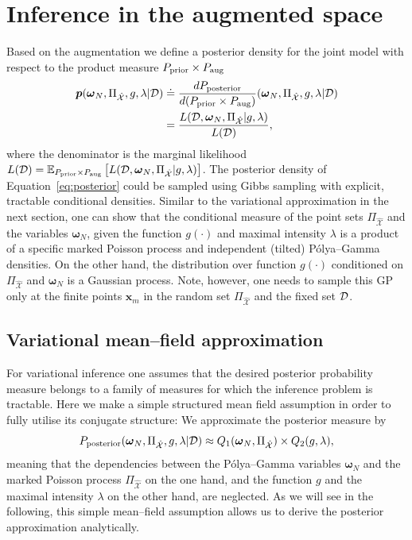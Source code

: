 \documentclass[twoside,11pt]{article}
\newcommand{\dataset}{{\cal D}}
\newcommand{\EE}[2]{\mathbb{E}_{#1}\left[ #2 \right]}
\newcommand{\bs}[1]{\boldsymbol{#1}}
\newcommand{\bx}{\boldsymbol{x}}
\newcommand{\bomega}{\boldsymbol{\omega}}
\newcommand{\X}{\mathcal{X}}
\begin{document}
\section{Inference in the augmented space}\label{sec:inference}
Based on the augmentation we
define a posterior density for the joint model with respect to the product measure $P_{\rm prior} \times P_{\rm aug}$
\begin{equation}\label{eq:posterior}
\begin{split}
\bs{p}(\bomega_N, \Pi_{\hat{\X}}, g, \lambda \vert \dataset) \doteq & \;
\frac{dP_{\rm posterior}}{d(P_{\rm prior} \times P_{\rm aug})} (\bomega_N, \Pi_{\hat{\X}}, g, \lambda \vert \dataset)\\
= &\; \frac{L(\dataset, \bomega_N, \Pi_{\hat{\X}} \vert g, \lambda)}{L(\dataset)},
\end{split}
\end{equation}
where the denominator is the marginal likelihood $L(\dataset) = \EE{P_{\rm prior} \times P_{\rm aug}}{L(\dataset, \bomega_N, \Pi_{\hat{\X}}\vert g, \lambda)}$.
The posterior density of Equation~\eqref{eq:posterior} could be sampled using Gibbs sampling with explicit, tractable conditional densities. Similar to the variational approximation in the next section, one can show that the conditional measure of the point sets $\Pi_{\hat{\X}}$ and the variables $\bomega_N$, given the 
function $g(\cdot)$ and maximal intensity $\lambda$ is a product of a specific marked Poisson process and independent (tilted) P\'olya--Gamma densities. On the other hand, the distribution over function $g(\cdot)$ conditioned on $\Pi_{\hat{\X}}$ and $\bomega_N$ is a Gaussian process. Note, however, one needs to sample this GP only at the finite points $\bx_m$ in the random set $\Pi_{\hat{\X}}$ and the fixed set $\dataset$.

\subsection{Variational mean--field approximation}\label{sec:variational}
For variational inference one assumes that the desired posterior probability measure belongs to a family of measures for which the inference problem is tractable. Here we make a simple structured mean field assumption in order to fully utilise its conjugate structure: We approximate the posterior measure by
\begin{equation}\label{eq:variational posterior measure}
P_{\rm posterior}(\bomega_N, \Pi_{\hat{\X}}, g, \lambda\vert \dataset)   \approx Q_1(\bomega_N, \Pi_{\hat{\X}}) \times Q_2(g,\lambda),
\end{equation}
meaning that the dependencies between the P\'olya--Gamma variables $\bomega_N$ and the marked Poisson process $\Pi_{\hat{\X}}$ on the one hand, and the function $g$ and the maximal intensity $\lambda$
on the other hand, are neglected. As we will see in the following, this simple mean--field assumption allows us to derive the posterior approximation analytically. 
\end{document}
